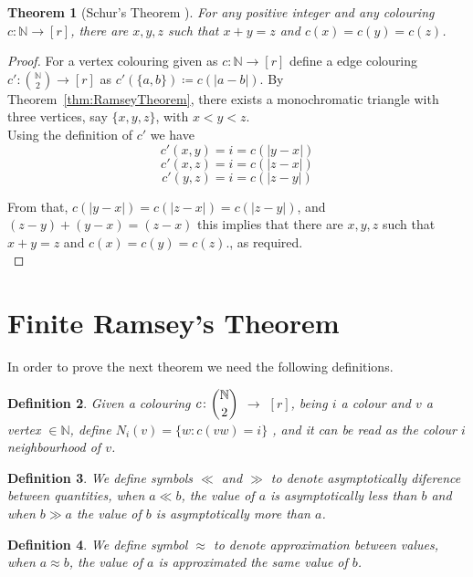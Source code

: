 \documentclass[12pt,twoside,a4paper]{book}
\numberwithin{equation}{section}
\newtheorem{theorem}             {Theorem}[section]
\newtheorem{definition}	[theorem] {Definition}
\theoremstyle{remark}
\begin{document}
\begin{theorem}[{Schur's Theorem \cite{Sc16}}]\label{thm:Schur'sTheorem} %
For any positive integer and any colouring $c\colon \mathbb{N} \rightarrow [r]$, there are $x,y,z$ such that $x+y=z$ and $c(x) = c(y) = c(z)$.
\end{theorem}
\begin{proof}
  For a vertex colouring  given as $c\colon \mathbb{N} \rightarrow [r]$ define a edge colouring $c'\colon \binom{\mathbb{N}}{2} \rightarrow [r]$ as $c'(\{a,b\}) \coloneqq c(|a-b|)$. By Theorem~\ref{thm:RamseyTheorem}, there exists a monochromatic triangle with three vertices, say $\{x,y,z\}$, with $x<y<z$.\\
Using the definition of $c'$  we have
$$c'({x,y}) = i = c(|y-x|)$$
$$c'({x,z})=  i = c(|z-x|)$$
$$c'({y,z}) = i = c(|z-y|)$$

From that, $c(|y-x|) = c(|z-x|) = c(|z-y|)$, and $(z-y)+(y-x)=(z-x)$ this implies that there are $x,y,z$ such that $x+y=z$ and $c(x) = c(y) = c(z)$., as required.\\
\end{proof}

\section{Finite Ramsey's Theorem}
In order to prove the next theorem we need the following definitions.
\begin{definition}
Given a colouring $c\colon\dbinom{\mathbb{N}}{2}$ $\rightarrow$ $[r]$, being $i$ a colour and  $v$ a vertex $\in \mathbb{N}$, define $N_i(v) =\{ w: c(vw)=i\}$ , and it can be read as the colour $i$ neighbourhood of $v$.
\end{definition}

\begin{definition}
We define symbols $\ll$ and $\gg$ to denote asymptotically diference between quantities, when $ a \ll b$, the value of $a$ is asymptotically less than $b$ and when $ b \gg a$ the  value of $b$ is asymptotically more than $a$.  
\end{definition}
\begin{definition}
We define symbol $\approx$ to denote approximation between values, when $ a \approx b$, the value of $a$ is approximated the same value of $b$.  
\end{definition}
\end{document}
